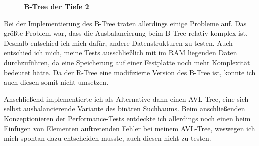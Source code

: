 \documentclass[11pt,a4paper]{article}
\begin{document}
\begin{figure}[H]
    \begin{center}
    \end{center}
    \caption{\textbf{B-Tree der Tiefe 2}}
\end{figure}

Bei der Implementierung des B-Tree traten allerdings einige Probleme auf.
Das größte Problem war, dass die Ausbalancierung beim B-Tree relativ komplex ist.
Deshalb entschied ich mich dafür, andere Datenstrukturen zu testen.
Auch entschied ich mich, meine Tests ausschließlich mit im RAM liegenden Daten
durchzuführen, da eine Speicherung auf einer Festplatte noch mehr Komplexität bedeutet
hätte. Da der R-Tree eine modifizierte Version des B-Tree ist, konnte ich auch diesen
somit nicht umsetzen.

\vspace*{0.5cm}

Anschließend implementierte ich als Alternative dann einen AVL-Tree, eine sich selbst
ausbalancierende Variante des binären Suchbaums. Beim anschließenden
Konzeptionieren der Performance-Tests entdeckte ich allerdings noch einen
beim Einfügen von Elementen auftretenden Fehler bei meinem AVL-Tree,
weswegen ich mich spontan dazu entscheiden musste, auch diesen nicht zu testen.
\end{document}
